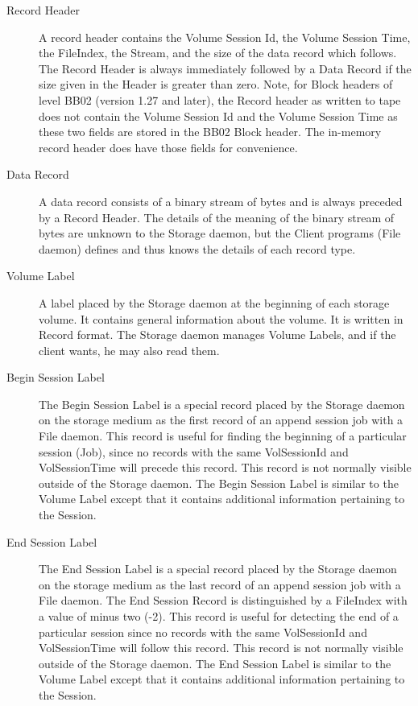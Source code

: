 \begin{description}
\item [Record Header]
   A record header contains the Volume Session Id, the  Volume Session Time, the
FileIndex, the Stream, and the size of the  data record which follows. The
Record Header is always immediately  followed by a Data Record if the size
given in the Header is greater  than zero. Note, for Block headers of level
BB02 (version 1.27  and later), the Record header as written to tape does not
contain  the Volume Session Id and the Volume Session Time as these two
fields are stored in the BB02 Block header. The in-memory record  header does
have those fields for convenience.

\item [Data Record]
   A data record consists of a binary stream of bytes  and is always preceded by
a Record Header. The details of the  meaning of the binary stream of bytes are
unknown to the Storage  daemon, but the Client programs (File daemon) defines
and thus  knows the details of each record type.

\item [Volume Label]
   A label placed by the Storage daemon at the beginning  of each storage volume.
It contains general information about  the volume. It is written in Record
format. The Storage daemon  manages Volume Labels, and if the client wants, he
may also  read them.

\item [Begin Session Label]
   The Begin Session Label is a special record  placed by the Storage daemon on
the storage medium as the first  record of an append session job with a File
daemon. This record  is useful for finding the beginning of a particular
session (Job),  since no records with the same VolSessionId and VolSessionTime
will precede this record. This record is not normally visible  outside of the
Storage daemon. The Begin Session Label is similar  to the Volume Label except
that it contains additional information  pertaining to the Session.

\item [End Session Label]
   The End Session Label is a special record  placed by the Storage daemon on the
storage medium as the last  record of an append session job with a File
daemon. The End  Session Record is distinguished by a FileIndex with a value
of  minus two (-2). This record is useful for detecting the end of a
particular session since no records with the same VolSessionId and
VolSessionTime will follow this record. This record is not normally  visible
outside of the Storage daemon. The End Session Label is  similar to the Volume
Label except that it contains additional  information pertaining to the
Session.
\end{description}

